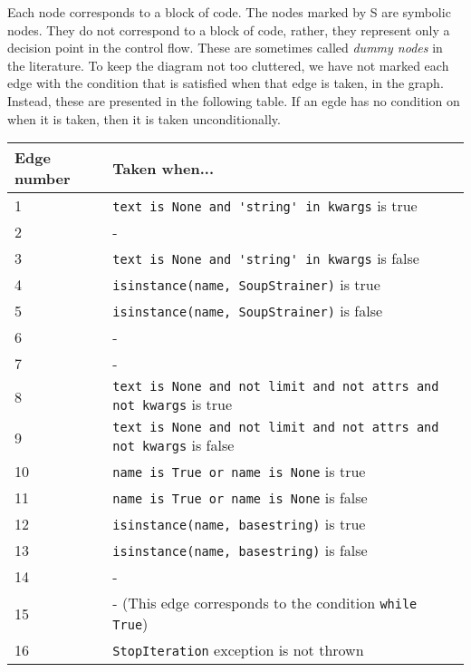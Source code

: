 \documentclass[10pt]{article}
\begin{document}
Each node corresponds to a block of code. The nodes marked by S are symbolic nodes. They do not correspond to a block of code, rather, they represent only a decision point in the control flow. These are sometimes called \textit{dummy nodes} in the literature. To keep the diagram not too cluttered, we have not marked each edge with the condition that is satisfied when that edge is taken, in the graph. Instead, these are presented in the following table. If an egde has no condition on when it is taken, then it is taken unconditionally. \\

\begin{tabular}{l|l}
Edge number & Taken when... \\ \hline
1           &  \lstinline[style = pythonstyle]$text is None and 'string' in kwargs$ is true \\
2           & - \\
3           & \lstinline[style = pythonstyle]$text is None and 'string' in kwargs$ is false \\
4           & \lstinline[style = pythonstyle]$isinstance(name, SoupStrainer)$ is true \\
5           & \lstinline[style = pythonstyle]$isinstance(name, SoupStrainer)$ is false \\
6           & - \\
7           & - \\
8           & \lstinline[style = pythonstyle]$text is None and not limit and not attrs and not kwargs$ is true \\
9           & \lstinline[style = pythonstyle]$text is None and not limit and not attrs and not kwargs$ is false \\
10          & \lstinline[style = pythonstyle]$name is True or name is None$ is true \\
11          & \lstinline[style = pythonstyle]$name is True or name is None$ is false \\
12          & \lstinline[style = pythonstyle]$isinstance(name, basestring)$ is true \\
13          & \lstinline[style = pythonstyle]$isinstance(name, basestring)$ is false\\
14          & - \\
15          & - (This edge corresponds to the condition \lstinline[style = pythonstyle]$while True$) \\
16          & \lstinline[style = pythonstyle]$StopIteration$ exception is not thrown \\ 

\end{tabular}
\end{document}
